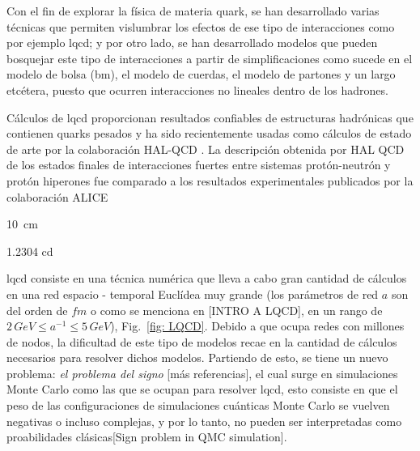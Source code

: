 Con el fin de explorar la física de materia quark, se han desarrollado varias técnicas que permiten vislumbrar los efectos de ese tipo de interacciones como por ejemplo \acrfull{lqcd}; y por otro lado, se han desarrollado modelos que pueden bosquejar este tipo de interacciones a partir de simplificaciones como sucede en el modelo de bolsa (\acrfull{bm}), el modelo de cuerdas, el modelo de partones y un largo etcétera\cite{DeTar_1983}, puesto que ocurren interacciones no lineales dentro de los hadrones. 


Cálculos de \acrshort{lqcd} proporcionan resultados confiables de estructuras hadrónicas que contienen quarks pesados y ha sido recientemente usadas como cálculos de estado de arte por la colaboración HAL-QCD \cite{Iritani_2019,Hatsuda_2017}. La descripción obtenida por HAL QCD de los estados finales de interacciones fuertes entre sistemas protón-neutrón y protón hiperones fue comparado a los resultados experimentales publicados por la colaboración ALICE \cite{Collaboration2020, Collaboration2021}

\qty{10}{cm}

\num{1.2304} \unit{\candela}

\acrshort{lqcd} consiste en una técnica numérica que lleva a cabo gran cantidad de cálculos en una red espacio - temporal Euclídea muy grande (los parámetros de red $a$ son del orden de $\mathit{\unit{\femto\meter}}$ o como se menciona en [INTRO A LQCD], en un rango de $2 \, \unit{GeV} \leq {a}^{-1} \leq 5 \, \unit{GeV}$), Fig.~\ref{fig: LQCD}. Debido a que ocupa redes con millones de nodos, la dificultad de este tipo de modelos recae en la cantidad de cálculos necesarios para resolver dichos modelos. 
Partiendo de esto, se tiene un nuevo problema: \emph{el problema del signo} [más referencias], el cual surge en simulaciones Monte Carlo como las que se ocupan para resolver \acrshort{lqcd}, esto consiste en que el peso de las configuraciones de simulaciones cuánticas Monte Carlo se vuelven negativas o incluso complejas, y por lo tanto, no pueden ser interpretadas como proabilidades clásicas[Sign problem in QMC simulation]. 

